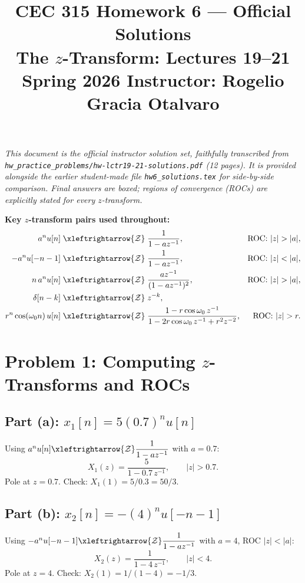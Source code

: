 \documentclass[11pt]{article}
\title{\textbf{CEC 315 Homework 6 --- Official Solutions} \\
  \large The $z$-Transform: Lectures 19--21 \\
  \normalsize Spring 2026 \quad Instructor: Rogelio Gracia Otalvaro}
\author{}
\date{}
\newcommand{\zt}{\xleftrightarrow{\mathcal{Z}}}
\newcommand{\ROC}[1]{\text{ROC: } #1}
\begin{document}
\maketitle
\thispagestyle{fancy}

\noindent\textit{This document is the official instructor solution set, faithfully transcribed from
\texttt{hw\_practice\_problems/hw-lctr19-21-solutions.pdf} (12 pages). It is provided
alongside the earlier student-made file \texttt{hw6\_solutions.tex} for side-by-side comparison.
Final answers are boxed; regions of convergence (ROCs) are explicitly stated for every
$z$-transform.}

\bigskip

\noindent\textbf{Key $z$-transform pairs used throughout:}
\begin{align*}
a^{n}u[n] &\;\zt\; \frac{1}{1-az^{-1}}, & \ROC{|z|>|a|}, \\
-a^{n}u[-n-1] &\;\zt\; \frac{1}{1-az^{-1}}, & \ROC{|z|<|a|}, \\
n\,a^{n}u[n] &\;\zt\; \frac{az^{-1}}{(1-az^{-1})^{2}}, & \ROC{|z|>|a|}, \\
\delta[n-k] &\;\zt\; z^{-k}, & \\
r^{n}\cos(\omega_0 n)\,u[n] &\;\zt\; \frac{1-r\cos\omega_0\,z^{-1}}{1-2r\cos\omega_0\,z^{-1}+r^{2}z^{-2}}, & \ROC{|z|>r}.
\end{align*}

\section*{Problem 1: Computing $z$-Transforms and ROCs}

\subsection*{Part (a): $x_1[n] = 5(0.7)^{n}u[n]$}
Using $a^{n}u[n]\zt \dfrac{1}{1-az^{-1}}$ with $a=0.7$:
\begin{equation*}
\boxed{X_1(z)=\dfrac{5}{1-0.7\,z^{-1}}, \qquad |z|>0.7.}
\end{equation*}
Pole at $z=0.7$. Check: $X_1(1)=5/0.3=50/3$.

\subsection*{Part (b): $x_2[n] = -(4)^{n}u[-n-1]$}
Using $-a^{n}u[-n-1]\zt \dfrac{1}{1-az^{-1}}$ with $a=4$, ROC $|z|<|a|$:
\begin{equation*}
\boxed{X_2(z)=\dfrac{1}{1-4\,z^{-1}}, \qquad |z|<4.}
\end{equation*}
Pole at $z=4$. Check: $X_2(1)=1/(1-4)=-1/3$.
\end{document}
